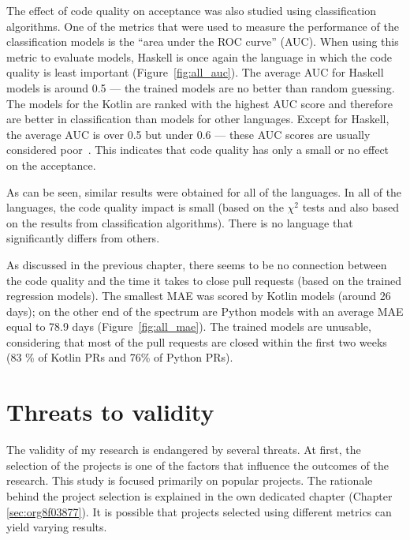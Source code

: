\documentclass[digital,oneside,oldtable,nolof,nolot,nocover]{fithesis4}
\begin{document}
The effect of code quality on acceptance was also studied using
classification algorithms.  One of the metrics that were used to measure the
performance of the classification models is the ``area under the ROC curve''
(AUC). When using this metric to evaluate models, Haskell is once again
the language in which the code quality is least important
(Figure~\ref{fig:all_auc}). The average AUC for Haskell models is around
0.5 --- the trained models are no better than random guessing.
The models for the Kotlin are ranked with the highest AUC score and therefore
are better in classification than models for other languages.
Except for Haskell, the average AUC is over 0.5 but under 0.6 --- these AUC
scores are usually considered poor~\cite{logreg}. This indicates that code quality
has only a small or no effect on the acceptance.

As can be seen, similar results were obtained for all of the languages.
In all of the languages, the code quality impact is small (based on the \(\chi^2\) tests
and also based on the results from classification algorithms). There is no language
that significantly differs from others.

As discussed in the previous chapter, there seems to be no connection between
the code quality and the time it takes to close pull requests (based on the
trained regression models). The smallest MAE was scored by Kotlin models
(around 26 days); on the other end of the spectrum are Python models with an
average MAE equal to 78.9 days (Figure~\ref{fig:all_mae}). The trained models are unusable, considering
that most of the pull requests are closed within the first two weeks (83 \% of Kotlin
PRs and 76\% of Python PRs).
\FloatBarrier
\section{Threats to validity}
\label{sec:org208675f}
The validity of my research is endangered by several threats.
At first, the selection of the projects is one of the factors that influence
the outcomes of the research. This study is focused primarily on popular
projects. The rationale behind the project selection is explained in the own dedicated
chapter (Chapter \ref{sec:org8f03877}). It is possible that projects selected using different metrics can yield
varying results.
\end{document}
